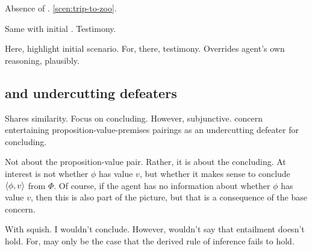 \begin{note}
  Absence of \requ{}.
  \autoref{scen:trip-to-zoo}.

  Same with initial .
  Testimony.
\end{note}

\begin{note}
  Here, highlight initial scenario.
  For, there, testimony.
  Overrides agent's own reasoning, plausibly.
\end{note}

\subsection{ and undercutting defeaters}

\begin{note}
  Shares similarity.
  Focus on concluding.
  However, subjunctive.
   concern entertaining proposition-value-premises pairings as an undercutting defeater for concluding.
\end{note}

\begin{note}
  Not about the proposition-value pair.
  Rather, it is about the concluding.
  At interest is not whether \(\phi\) has value \(v\), but whether it makes sense to conclude \(\langle \phi, v \rangle\) from \(\Phi\).
  Of course, if the agent has no information about whether \(\phi\) has value \(v\), then this is also part of the picture, but that is a consequence of the base concern.

  With squish.
  I wouldn't conclude.
  However, wouldn't say that entailment doesn't hold.
  For, may only be the case that the derived rule of inference fails to hold.
\end{note}

